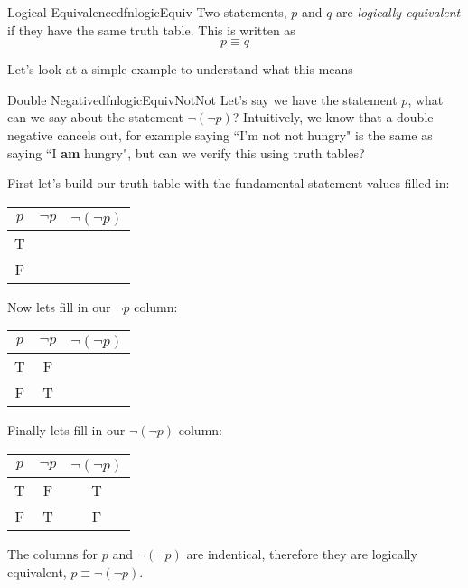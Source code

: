 \begin{dfn}[label={def:logicalEquivalence}]{Logical Equivalence}{dfnlogicEquiv}
    Two statements, $p$ and $q$ are \emph{logically equivalent} if they have the same truth table. This is written as $$ p \equiv q$$
\end{dfn}

Let's look at a simple example to understand what this means

\begin{exmpl}[label={exmpl:logicEquivNotNot}]{Double Negative}{dfnlogicEquivNotNot}
    Let's say we have the statement $p$, what can we say about the statement $\lnot (\lnot p)$? Intuitively, we know that a double negative cancels out, for example saying ``I'm not not hungry" is the same as saying ``I \textbf{am} hungry", but can we verify this using truth tables?

    First let's build our truth table with the fundamental statement values filled in:
    \begin{center}
        \begin{tabular}{|c|c|c|}
            \hline
            $p$ & $\lnot p$ & $\lnot (\lnot p)$ \\
            \hline
            T   &           &                   \\
            \hline
            F   &           &                   \\
            \hline
        \end{tabular}
    \end{center}

    Now lets fill in our $\lnot p$ column:
    \begin{center}
        \begin{tabular}{|c|c|c|}
            \hline
            $p$ & $\lnot p$ & $\lnot (\lnot p)$ \\
            \hline
            T   & F         &                   \\
            \hline
            F   & T         &                   \\
            \hline
        \end{tabular}
    \end{center}

    Finally lets fill in our $\lnot (\lnot p)$ column:
    \begin{center}
        \begin{tabular}{|c|c|c|}
            \hline
            $p$ & $\lnot p$ & $\lnot (\lnot p)$ \\
            \hline
            T   & F         & T                 \\
            \hline
            F   & T         & F                 \\
            \hline
        \end{tabular}
    \end{center}

    The columns for $p$ and $\lnot(\lnot p)$ are indentical, therefore they are logically equivalent, $p \equiv \lnot(\lnot p)$.
\end{exmpl}


